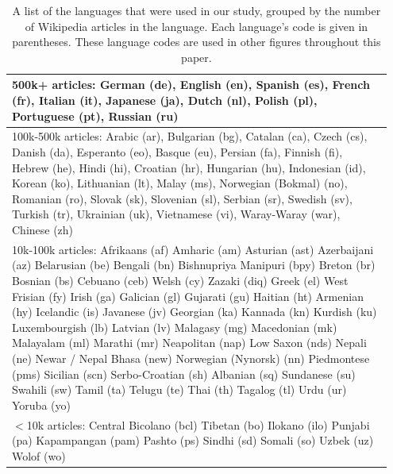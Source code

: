\documentclass[11pt]{article}
\begin{document}
\begin{table}[h]
\scriptsize 
\begin{center}
\begin{tabular}{|p{0.95\linewidth}|}
\hline
{\sc 500k+ articles:} German (de), English (en), Spanish (es), French (fr), Italian (it), Japanese (ja), Dutch (nl), Polish (pl), Portuguese (pt), Russian (ru)\\
\hline
{\sc 100k-500k articles:} Arabic (ar), Bulgarian (bg), Catalan (ca), Czech (cs), Danish (da), Esperanto (eo), Basque (eu), Persian (fa), Finnish (fi), Hebrew (he), Hindi (hi), Croatian (hr), Hungarian (hu), Indonesian (id), Korean (ko), Lithuanian (lt), Malay (ms), Norwegian (Bokmal) (no), Romanian (ro), Slovak (sk), Slovenian (sl), Serbian (sr), Swedish (sv), Turkish (tr), Ukrainian (uk), Vietnamese (vi), Waray-Waray (war), Chinese (zh)\\
\hline
{\sc 10k-100k articles:}
Afrikaans (af) Amharic (am) Asturian (ast) Azerbaijani (az) Belarusian (be) Bengali (bn) Bishnupriya Manipuri (bpy) Breton (br) Bosnian (bs) Cebuano (ceb) Welsh (cy) Zazaki (diq) Greek (el) West Frisian (fy) Irish (ga) Galician (gl) Gujarati (gu) Haitian (ht) Armenian (hy) Icelandic (is) Javanese (jv) Georgian (ka) Kannada (kn) Kurdish (ku) Luxembourgish (lb) Latvian (lv) Malagasy (mg) Macedonian (mk) Malayalam (ml) Marathi (mr) Neapolitan (nap) Low Saxon (nds) Nepali (ne) Newar / Nepal Bhasa (new) Norwegian (Nynorsk) (nn) Piedmontese (pms) Sicilian (scn) Serbo-Croatian (sh) Albanian (sq) Sundanese (su) Swahili (sw) Tamil (ta) Telugu (te) Thai (th) Tagalog (tl) Urdu (ur) Yoruba (yo)\\ 
\hline
{\sc $<$10k articles:} Central Bicolano (bcl) Tibetan (bo) Ilokano (ilo) Punjabi (pa) Kapampangan (pam) Pashto (ps) Sindhi (sd) Somali (so) Uzbek (uz) Wolof (wo)\\

\hline
\end{tabular}
\end{center}
\normalsize
\caption{A list of the languages that were used in our study, grouped by the number of Wikipedia articles in the language.  Each language's code is given in parentheses.  These language codes are used in other figures throughout this paper.}\label{wikipedia-buckets}
\end{table}%
\end{document}
